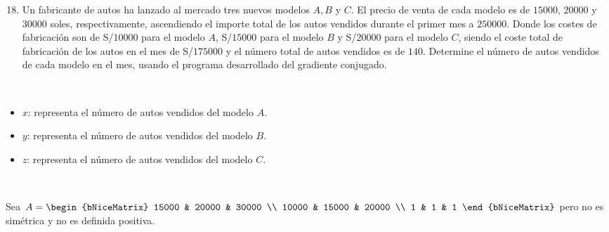 \begin{frame}
	\begin{enumerate}\setcounter{enumi}{17}
		\item

		      Un fabricante de autos ha lanzado al mercado tres nuevos
		      modelos $A, B$ y $C$.
		      El precio de venta de cada modelo es de $15000$, $20000$ y
		      $30000$ soles, respectivamente, ascendiendo el importe
		      total de los autos vendidos durante el primer mes a
		      $250000$.
		      Donde los costes de fabricación son de S/$10000$ para el
		      modelo $A$, S/$15000$ para el modelo $B$ y S/$20000$ para
		      el modelo $C$, siendo el coste total de fabricación de los
		      autos en el mes de S/$175000$ y el número total de autos
		      vendidos es de $140$.
		      Determine el número de autos vendidos de cada modelo en el
		      mes, usando el programa desarrollado del gradiente conjugado.

	\end{enumerate}
	\begin{solution}

		\

		\begin{minipage}{0.55\textwidth}
			\begin{itemize}
				\item

				      $x$: representa el número de autos vendidos del modelo $A$.

				\item

				      $y$: representa el número de autos vendidos del modelo $B$.

				\item

				      $z$: representa el número de autos vendidos del modelo $C$.
			\end{itemize}
		\end{minipage}
		\begin{minipage}{0.35\textwidth}
		\end{minipage}

		\

		Sea
		\begin{math}
			A=
			\begin{bNiceMatrix}
				15000 & 20000 & 30000 \\
				10000 & 15000 & 20000 \\
				1     & 1     & 1
			\end{bNiceMatrix}
		\end{math}
		pero \alert{no es simétrica} y \alert{no es definida positiva}.


\end{solution}
\end{frame}
